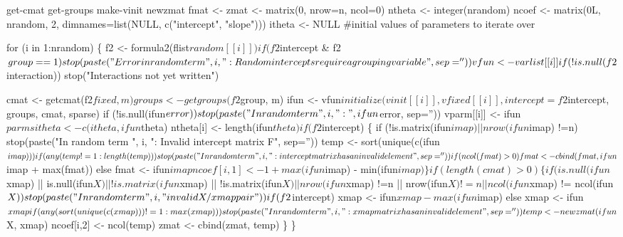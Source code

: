 \documentclass{article}
\begin{document}
\nwenddocs{}\plusendmoddef
\LA{}get-cmat\RA{}
\LA{}get-groups\RA{}
\LA{}make-vinit\RA{}
\LA{}newzmat\RA{}
fmat <- zmat <- matrix(0, nrow=n, ncol=0)
ntheta <- integer(nrandom)
ncoef  <- matrix(0L, nrandom, 2, dimnames=list(NULL, c("intercept", "slope")))
itheta <-  NULL   #initial values of parameters to iterate over

for (i in 1:nrandom) \{
    f2 <- formula2(flist$random[[i]])
    if (f2$intercept & f2$group==1)
        stop(paste("Error in random term ", i, 
                   ": Random intercepts require a grouping variable", sep=''))
    vfun <- varlist[[i]]
    if (!is.null(f2$interaction)) stop("Interactions not yet written")

    cmat <- getcmat(f2$fixed, m)
    groups <- getgroups(f2$group, m)
    ifun <- vfun$initialize(vinit[[i]], vfixed[[i]], intercept=f2$intercept, 
                        groups, cmat, sparse)
    if (!is.null(ifun$error)) 
        stop(paste("In random term ", i, ": ", ifun$error, sep=''))
    vparm[[i]] <- ifun$parms

    itheta <- c(itheta, ifun$theta)
    ntheta[i] <- length(ifun$theta)

    if (f2$intercept) \{
        if (!is.matrix(ifun$imap) || nrow(ifun$imap) !=n) 
            stop(paste("In random term ", i, 
                       ": Invalid intercept matrix F", sep=''))
        temp <- sort(unique(c(ifun$imap)))
        if (any(temp != 1:length(temp)))
            stop(paste("In random term ", i,
                       ": intercept matrix has an invalid element", sep=''))

        if (ncol(fmat) >0) fmat <- cbind(fmat, ifun$imap + max(fmat))
        else fmat <- ifun$imap
        ncoef[i,1] <- 1+ max(ifun$imap) - min(ifun$imap)
        \}

    if (length(cmat)>0) \{
        if (is.null(ifun$xmap) || is.null(ifun$X) ||
            !is.matrix(ifun$xmap) || !is.matrix(ifun$X) ||
            nrow(ifun$xmap) !=n || nrow(ifun$X) != n ||
            ncol(ifun$xmap) != ncol(ifun$X))
            stop(paste("In random term ", i,
                       "invalid X/xmap pair"))
        if (f2$intercept) xmap <- ifun$xmap - max(ifun$imap)
        else xmap <- ifun$xmap
        if (any(sort(unique(c(xmap))) != 1:max(xmap)))
             stop(paste("In random term ", i,
                       ": xmap matrix has an invalid element", sep=''))
        
        temp <- newzmat(ifun$X, xmap)
        ncoef[i,2] <- ncol(temp)
        zmat <- cbind(zmat, temp)
        \}
    \} 
\nwendcode{}\nwdocspar
\end{document}
